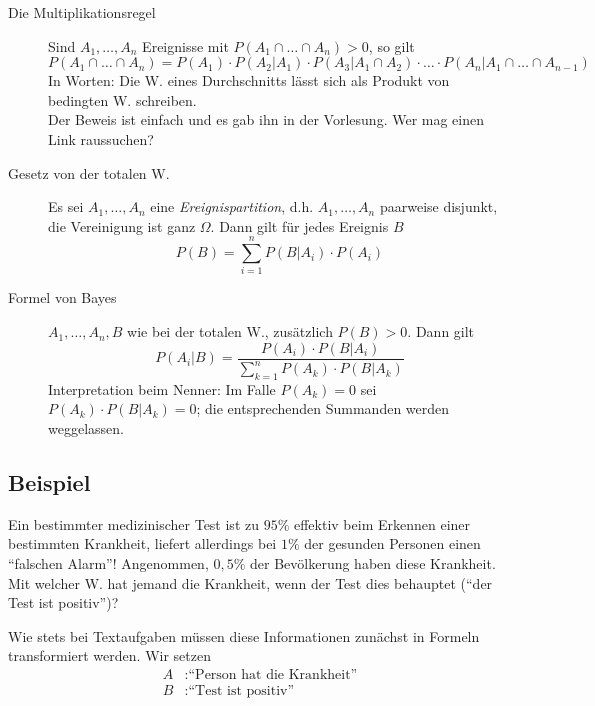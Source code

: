 \begin{description}
	\item[Die Multiplikationsregel] Sind $A_1,\ldots,A_n$ Ereignisse mit $P(A_1\cap\ldots\cap A_n)>0$, so gilt
		\begin{equation}
			P(A_1\cap\ldots\cap A_n) = P(A_1)\cdot P(A_2|A_1) \cdot P(A_3|A_1 \cap A_2) \cdot \ldots \cdot P(A_n|A_1\cap\ldots\cap A_{n-1})
		\end{equation}
		In Worten: Die W. eines Durchschnitts lässt sich als Produkt von bedingten W. schreiben.\\
		Der Beweis ist einfach und es gab ihn in der Vorlesung. Wer mag einen Link raussuchen?
	\item[Gesetz von der totalen W.] Es sei $A_1,\ldots,A_n$ eine \emph{Ereignispartition}, d.h. %
		$A_1,\ldots,A_n$ paarweise disjunkt, die Vereinigung ist ganz $\Omega$. Dann gilt für jedes Ereignis $B$
		\begin{equation}
			P(B) = \sum_{i=1}^n P(B|A_i)\cdot P(A_i)
		\end{equation}
	\item[Formel von Bayes] $A_1,\ldots,A_n,B$ wie bei der totalen W., zusätzlich $P(B)>0$. Dann gilt
		\begin{equation}
			\label{def:bayes}
			P(A_i|B) = \frac{P(A_i)\cdot P(B|A_i)}{\sum_{k=1}^n P(A_k)\cdot P(B|A_k)}
		\end{equation}
		Interpretation beim Nenner: Im Falle $P(A_k)=0$ sei $P(A_k)\cdot P(B|A_k) = 0$; die entsprechenden Summanden werden weggelassen.
\end{description}

\subsection{Beispiel}

Ein bestimmter medizinischer Test ist zu $95\%$ effektiv beim Erkennen einer bestimmten Krankheit, liefert allerdings bei $1\%$ der gesunden Personen einen ``falschen Alarm''!
Angenommen, $0,5\%$ der Bevölkerung haben diese Krankheit.
Mit welcher W. hat jemand die Krankheit, wenn der Test dies behauptet (``der Test ist positiv'')?

Wie stets bei Textaufgaben müssen diese Informationen zunächst in Formeln transformiert werden. Wir setzen
\begin{align*}
    A &: \text{``Person hat die Krankheit''} \\
    B &: \text{``Test ist positiv''}
\end{align*}

